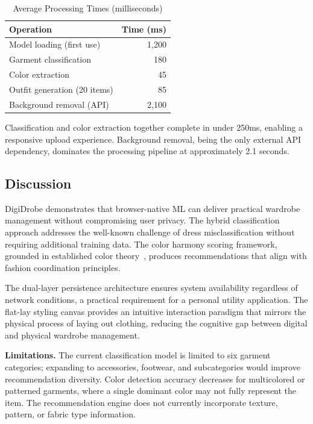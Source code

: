 \documentclass[conference]{IEEEtran}
\begin{document}
\begin{table}[htbp]
\caption{Average Processing Times (milliseconds)}
\begin{center}
\begin{tabular}{lr}
\toprule
\textbf{Operation} & \textbf{Time (ms)} \\
\midrule
Model loading (first use) & 1,200 \\
Garment classification & 180 \\
Color extraction & 45 \\
Outfit generation (20 items) & 85 \\
Background removal (API) & 2,100 \\
\bottomrule
\end{tabular}
\end{center}
\label{tab:performance}
\end{table}

Classification and color extraction together complete in under 250ms, enabling a responsive upload experience. Background removal, being the only external API dependency, dominates the processing pipeline at approximately 2.1 seconds.

\subsection{Discussion}

DigiDrobe demonstrates that browser-native ML can deliver practical wardrobe management without compromising user privacy. The hybrid classification approach addresses the well-known challenge of dress misclassification without requiring additional training data. The color harmony scoring framework, grounded in established color theory~\cite{ou2012}, produces recommendations that align with fashion coordination principles.

The dual-layer persistence architecture ensures system availability regardless of network conditions, a practical requirement for a personal utility application. The flat-lay styling canvas provides an intuitive interaction paradigm that mirrors the physical process of laying out clothing, reducing the cognitive gap between digital and physical wardrobe management.

\textbf{Limitations.} The current classification model is limited to six garment categories; expanding to accessories, footwear, and subcategories would improve recommendation diversity. Color detection accuracy decreases for multicolored or patterned garments, where a single dominant color may not fully represent the item. The recommendation engine does not currently incorporate texture, pattern, or fabric type information.
\end{document}

